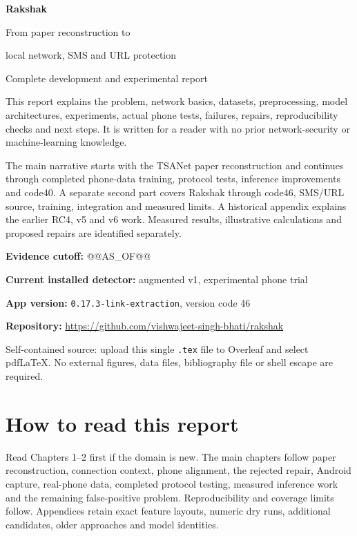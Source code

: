 \documentclass[11pt,a4paper,oneside]{report}
\newcommand{\code}[1]{\nolinkurl{#1}}
\begin{document}
\hypersetup{pageanchor=false}
\begin{titlepage}
\centering\vspace*{17mm}
{\Huge\bfseries Rakshak\par}\vspace{7mm}
{\LARGE From paper reconstruction to\par local network, SMS and URL protection\par}\vspace{12mm}
{\Large Complete development and experimental report\par}\vspace{10mm}
\begin{minipage}{0.88\textwidth}
This report explains the problem, network basics, datasets, preprocessing, model architectures, experiments, actual phone tests, failures, repairs, reproducibility checks and next steps. It is written for a reader with no prior network-security or machine-learning knowledge.

The main narrative starts with the TSANet paper reconstruction and continues through completed phone-data training, protocol tests, inference improvements and code40. A separate second part covers Rakshak through code46, SMS/URL source, training, integration and measured limits. A historical appendix explains the earlier RC4, v5 and v6 work. Measured results, illustrative calculations and proposed repairs are identified separately.
\end{minipage}
\vfill
\textbf{Evidence cutoff:} @@AS_OF@@\par
\textbf{Current installed detector:} augmented v1, experimental phone trial\par
\textbf{App version:} \code{0.17.3-link-extraction}, version code 46\par
\textbf{Repository:} \url{https://github.com/vishwajeet-singh-bhati/rakshak}\par
\vspace{8mm}
{\small Self-contained source: upload this single \code{.tex} file to Overleaf and select pdfLaTeX. No external figures, data files, bibliography file or shell escape are required.}
\end{titlepage}
\hypersetup{pageanchor=true}
\chapter*{How to read this report}
Read Chapters 1--2 first if the domain is new. The main chapters follow paper reconstruction, connection context, phone alignment, the rejected repair, Android capture, real-phone data, completed protocol testing, measured inference work and the remaining false-positive problem. Reproducibility and coverage limits follow. Appendices retain exact feature layouts, numeric dry runs, additional candidates, older approaches and model identities.
\end{document}
